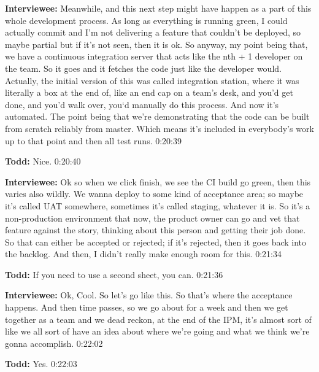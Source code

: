 \textbf{Interviewee:}   Meanwhile, and this next step might have happen as a part of this whole development process. As long as everything is running green, I could actually commit and I'm not delivering a feature that couldn't be deployed, so maybe partial but if it's not seen, then it is ok.  So anyway, my point being that, we have a continuous integration server that acts like the nth + 1 developer on the team.  So it goes and it fetches the code just like the developer would.  Actually, the initial version of this was called integration station, where it was literally a box at the end of, like an end cap on a team's desk, and you'd get done, and you'd walk over, you‘d manually do this process.  And now it's automated.  The point being that we're demonstrating that the code can be built from scratch reliably from master.  Which means it's included in everybody's work up to that point and then all test runs. 0:20:39

\textbf{Todd:}  	Nice.  0:20:40

\textbf{Interviewee:}  	Ok so when we click finish, we see the CI build go green, then this varies also wildly.  We wanna deploy to some kind of acceptance area; so maybe it's called UAT somewhere, sometimes it's called staging, whatever it is.  So it's a non-production environment that now, the product owner can go and vet that feature against the story, thinking about this person and getting their job done.  So that can either be accepted or rejected; if it's rejected, then it goes back into the backlog.  And then, I didn't really make enough room for this.  0:21:34

\textbf{Todd:}  	If you need to use a second sheet, you can.  0:21:36

\textbf{Interviewee:}  	Ok, Cool.  So let's go like this.  So that's where the acceptance happens.  And then time passes, so we go about for a week and then we get together as a team and we dead reckon, at the end of the IPM, it's almost sort of like we all sort of have an idea about where we're going and what we think we're gonna accomplish.  0:22:02

\textbf{Todd:}  	Yes.  0:22:03

